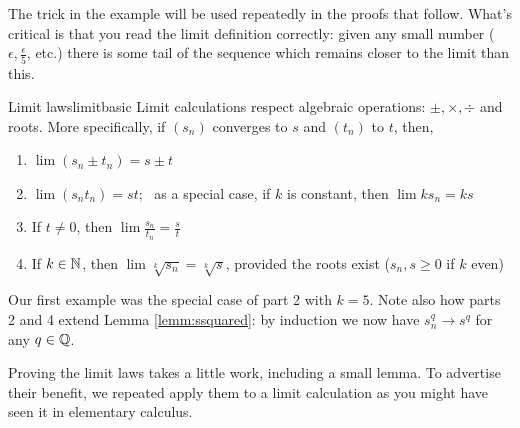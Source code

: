 The trick in the example will be used repeatedly in the proofs that follow. What's critical is that you read the limit definition correctly: given any small number ($\epsilon,\frac\epsilon 5$, etc.) there is some tail of the sequence which remains closer to the limit than this.

\begin{thm}{Limit laws}{limitbasic}
Limit calculations respect algebraic operations: $\pm, \times,\div$ and roots.\smallbreak
More specifically, if $(s_n)$ converges to $s$ and $(t_n)$ to $t$, then,
\begin{enumerate}
	\item $\lim (s_n\pm t_n)=s\pm t$
	\item $\lim(s_nt_n)=st$; \ as a special case, if $k$ is constant, then $\lim ks_n=ks$
	\item If $t\neq 0$, then $\lim \frac{s_n}{t_n}=\frac st$
	\item If $k\in\mathbb{N}$, then $\lim \sqrt[k]{s_n}=\sqrt[k]{s}$, provided the roots exist ($s_n,s\ge 0$ if $k$ even)
\end{enumerate}
\end{thm}

Our first example was the special case of part 2 with $k=5$. Note also how parts 2 and 4 extend Lemma \ref{lemm:ssquared}: by induction we now have $s_n^q\to s^q$ for any $q\in\mathbb{Q}$.\smallbreak

Proving the limit laws takes a little work, including a small lemma. To advertise their benefit, we repeated apply them to a limit calculation as you might have seen it in elementary calculus.

